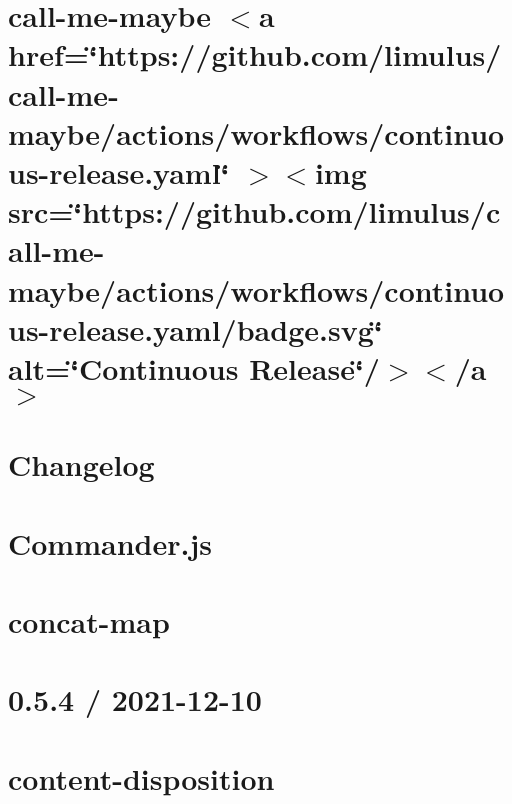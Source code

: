 \documentclass[twoside]{book}
\newcommand{\+}{\discretionary{\mbox{\scriptsize$\hookleftarrow$}}{}{}}
\begin{document}
\chapter{call-\/me-\/maybe \texorpdfstring{$<$}{<}a href=\char`\"{}https\+://github.\+com/limulus/call-\/me-\/maybe/actions/workflows/continuous-\/release.\+yaml\char`\"{} \texorpdfstring{$>$}{>}\texorpdfstring{$<$}{<}img src=\char`\"{}https\+://github.\+com/limulus/call-\/me-\/maybe/actions/workflows/continuous-\/release.\+yaml/badge.\+svg\char`\"{} alt=\char`\"{}\+Continuous Release\char`\"{}/\texorpdfstring{$>$}{>}\texorpdfstring{$<$}{<}/a\texorpdfstring{$>$}{>}}
\label{md_Backend_nodejs_node_modules_call_me_maybe_README}

\chapter{Changelog}
\label{md_Backend_nodejs_node_modules_commander_CHANGELOG}

\chapter{Commander.\+js}
\label{md_Backend_nodejs_node_modules_commander_Readme}

\chapter{concat-\/map}
\label{md_Backend_nodejs_node_modules_concat_map_README}

\chapter{0.5.4 / 2021-\/12-\/10}
\label{md_Backend_nodejs_node_modules_content_disposition_HISTORY}

\chapter{content-\/disposition}
\label{md_Backend_nodejs_node_modules_content_disposition_README}

\end{document}
